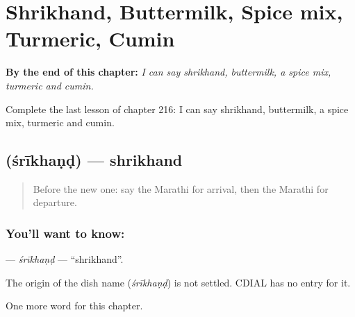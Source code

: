 
\chapter{Shrikhand, Buttermilk, Spice mix, Turmeric, Cumin}
\label{ch:mr-shrikhand-buttermilk-spice-mix-turmeric-cumin}

\begin{chapteropening}
\textbf{By the end of this chapter:} \emph{I can say shrikhand, buttermilk, a spice mix, turmeric and cumin.}

Complete the last lesson of chapter 216: I can say shrikhand, buttermilk, a spice mix, turmeric and cumin.
\end{chapteropening}

\section[\texorpdfstring{\mr{श्रीखंड} (śrīkhaṇḍ)}{श्रीखंड (śrīkhaṇḍ)}]{ (śrīkhaṇḍ) — shrikhand}

\label{lesson:MR-C216-srikhand}



\begin{quote}
Before the new one: say the Marathi for arrival, then the Marathi for departure.
\end{quote}

\subsection*{You'll want to know: }
\textbf{} — \emph{śrīkhaṇḍ} — \textquotedblleft{}shrikhand\textquotedblright{}.

\begin{cousinweb}
The origin of the dish name \textbf{} (\emph{śrīkhaṇḍ}) is not settled. CDIAL has no entry for it.
\end{cousinweb}

\begin{grammarlens}[title={What you've built}]
One more word for this chapter.
\end{grammarlens}

